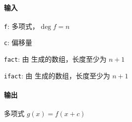 \paragraph{输入}

\verb|f|: 多项式，\(\deg f=n\)

\verb|c|: 偏移量

\verb|fact|: 由  生成的数组，长度至少为 \(n+1\)

\verb|ifact|: 由  生成的数组，长度至少为 \(n+1\)

\paragraph{输出}

多项式 \(g(x)=f(x+c)\)
